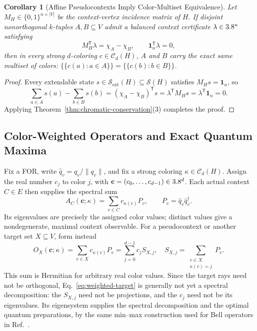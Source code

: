 \documentclass[aps,pra,reprint,superscriptaddress,longbibliography,nofootinbib,floatfix,10pt]{revtex4-2}
\newtheorem{corollary}[theorem]{Corollary}
\theoremstyle{definition}\newtheorem{definition}[theorem]{Definition}
\theoremstyle{remark}\newtheorem{remark}[theorem]{Remark}
\newcommand{\Sc}{\mathcal S}\newcommand{\Cc}{\mathcal C}\newcommand{\Wc}{\mathcal W}
\begin{document}
\begin{corollary}[Affine Pseudocontexts Imply Color-Multiset Equivalence]\label{cor:affine-to-chromatic}
Let $M_H\in\{0,1\}^{n\times |V|}$ be the context-vertex incidence matrix of $H$. If disjoint nonorthogonal $k$-tuples $A,B\subseteq V$ admit a balanced context certificate $\lambda\in3.8^n$ satisfying~\cite{2026-Navara-Svozil-pseudocontexts}
\begin{equation}\label{eq:balanced-certificate}
M_H^{\mathsf T}\lambda = \chi_A - \chi_B,\qquad \mathbf{1}_n^{\mathsf T}\lambda = 0,
\end{equation}
then in every strong $d$-coloring $c\in\Cc_d(H)$, $A$ and $B$ carry the exact same multiset of colors: $\{\!\{c(a):a\in A\}\!\}=\{\!\{c(b):b\in B\}\!\}$.
\end{corollary}
\begin{proof}
Every extendable state $s\in\Sc_{\mathrm{ext}}(H)\subseteq\Sc(H)$ satisfies $M_H s=\mathbf{1}_n$, so
\[
\sum_{a\in A}s(a)-\sum_{b\in B}s(b)=(\chi_A-\chi_B)^{\mathsf T}s=\lambda^{\mathsf T}M_H s=\lambda^{\mathsf T}\mathbf{1}_n=0.
\]
Applying Theorem~\ref{thm:chromatic-conservation}(3) completes the proof.
\end{proof}

\subsection{Color-Weighted Operators and Exact Quantum Maxima}\label{sec:weighted-framework}

Fix a FOR, write $\hat q_v=q_v/\|q_v\|$, and fix a strong coloring $\kappa\in\Cc_d(H)$. Assign the real number $c_j$ to color $j$, with $\mathbf c=(c_0,\ldots,c_{d-1})\in3.8^d$. Each actual context $C\in E$ then supplies the spectral sum
\begin{equation}\label{eq:weighted-context}
A_C(\mathbf c;\kappa)=\sum_{v\in C}c_{\kappa(v)}P_v,
\qquad P_v=\hat q_v\hat q_v^\dagger.
\end{equation}
Its eigenvalues are precisely the assigned color values; distinct values give a nondegenerate, maximal context observable. For a pseudocontext or another target set $X\subseteq V$, form instead
\begin{equation}\label{eq:weighted-target}
O_X(\mathbf c;\kappa)=\sum_{v\in X}c_{\kappa(v)}P_v
=\sum_{j=0}^{d-1}c_j S_{X,j},\quad
S_{X,j}=\sum_{\substack{v\in X\\\kappa(v)=j}}P_v.
\end{equation}
This sum is Hermitian for arbitrary real color values. Since the target rays need not be orthogonal, Eq.~\eqref{eq:weighted-target} is generally not yet a spectral decomposition: the $S_{X,j}$ need not be projections, and the $c_j$ need not be its eigenvalues. Its eigensystem supplies the spectral decomposition and the optimal quantum preparations, by the same min--max construction used for Bell operators in Ref.~\cite{filipp-svo-04-qbounds}.
\end{document}
